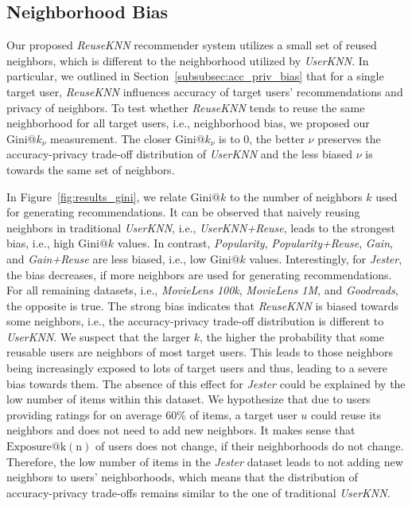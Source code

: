 \documentclass[manuscript,review,anonymous]{acmart}
\begin{document}
\subsection{Neighborhood Bias}
Our proposed \emph{ReuseKNN} recommender system utilizes a small set of reused neighbors, which is different to the neighborhood utilized by \emph{UserKNN}.
In particular, we outlined in Section~\ref{subsubsec:acc_priv_bias} that for a single target user, \emph{ReuseKNN} influences accuracy of target users' recommendations and privacy of neighbors.
To test whether \emph{ReuseKNN} tends to reuse the same neighborhood for all target users, i.e., neighborhood bias, we proposed our $\mathrm{Gini}@k_\nu$ measurement.
The closer $\mathrm{Gini}@k_\nu$ is to 0, the better $\nu$ preserves the accuracy-privacy trade-off distribution of \emph{UserKNN} and the less biased $\nu$ is towards the same set of neighbors.

In Figure~\ref{fig:results_gini}, we relate $\mathrm{Gini}@k$ to the number of neighbors $k$ used for generating recommendations.
It can be observed that naively reusing neighbors in traditional \emph{UserKNN}, i.e., \emph{UserKNN+Reuse}, leads to the strongest bias, i.e., high $\mathrm{Gini}@k$ values.
In contrast, \emph{Popularity}, \emph{Popularity+Reuse}, \emph{Gain}, and \emph{Gain+Reuse} are less biased, i.e., low $\mathrm{Gini}@k$ values.
Interestingly, for \emph{Jester}, the bias decreases, if more neighbors are used for generating recommendations.
For all remaining datasets, i.e., \emph{MovieLens 100k}, \emph{MovieLens 1M}, and \emph{Goodreads}, the opposite is true.
The strong bias indicates that \emph{ReuseKNN} is biased towards some neighbors, i.e., the accuracy-privacy trade-off distribution is different to \emph{UserKNN}.
We suspect that the larger $k$, the higher the probability that some reusable users are neighbors of most target users.
This leads to those neighbors being increasingly exposed to lots of target users and thus, leading to a severe bias towards them. 
The absence of this effect for \emph{Jester} could be explained by the low number of items within this dataset. 
We hypothesize that due to users providing ratings for on average 60\% of items, a target user $u$ could reuse its neighbors and does not need to add new neighbors.
It makes sense that $\mathrm{Exposure@k(n)}$ of users does not change, if their neighborhoods do not change.
Therefore, the low number of items in the \emph{Jester} dataset leads to not adding new neighbors to users' neighborhoods, which means that the distribution of accuracy-privacy trade-offs remains similar to the one of traditional \emph{UserKNN}.
\end{document}
